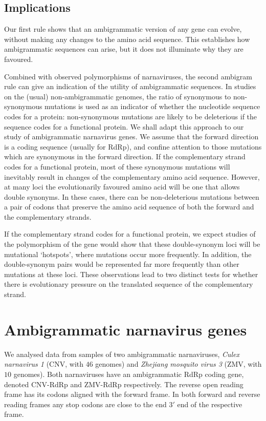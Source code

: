 \documentclass[unnumsec,webpdf,contemporary,large,namedate]{oup-authoring-template}%
\theoremstyle{thmstyleone}%
\theoremstyle{thmstyletwo}%
\theoremstyle{thmstylethree}%
\begin{document}
\subsection{Implications}
\label{sec: 2.3}

Our first rule shows that an ambigrammatic version of any gene can evolve, without
making any changes to the amino acid sequence. This establishes how ambigrammatic sequences
can arise, but it does not illuminate why they are favoured.

Combined with observed polymorphisms of narnaviruses, the second ambigram rule can give an
indication of the utility of ambigrammatic sequences. In studies on the (usual) non-ambigrammatic
genomes, the ratio of synonymous to non-synonymous mutations is used as an indicator of
whether the nucleotide sequence codes for a protein: non-synonymous mutations
are likely to be deleterious if the sequence codes for a functional protein.
We shall adapt this approach to our study of ambigrammatic narnavirus genes.
We assume that the forward direction is a coding sequence (usually for RdRp),
and confine attention to those mutations which are synonymous in the forward
direction. If the complementary strand codes for a functional protein, most of these
synonymous mutations will inevitably result in changes of the complementary
amino acid sequence. However, at many loci the evolutionarily favoured amino acid
will be one that allows double synonyms. In these cases, there can be
non-deleterious mutations between a pair of codons that preserve the amino acid
sequence of both the forward and the
complementary strands.

If the complementary strand codes for a functional protein, we expect studies of the
polymorphism of the gene would show that these double-synonym loci will be
mutational \lq hotspots', where mutations occur more frequently. In addition, the double-synonym pairs
would be represented far more frequently than other mutations at these loci. These observations
lead to two distinct tests for whether there is evolutionary pressure on the translated sequence of the
complementary strand.

\section{Ambigrammatic narnavirus genes}
\label{sec: 3}

We analysed data from samples of two ambigrammatic narnaviruses,
\emph{Culex narnavirus 1} (CNV, with $46$ genomes) and \emph{Zhejiang mosquito virus 3} (ZMV, with
$10$ genomes). Both narnaviruses have an ambigrammatic RdRp coding gene, denoted CNV-RdRp and
ZMV-RdRp respectively. The reverse open reading frame has its codons aligned with the forward frame.
In both forward and reverse reading frames any stop codons are close to the end $3'$ end of the
respective frame.
\end{document}
